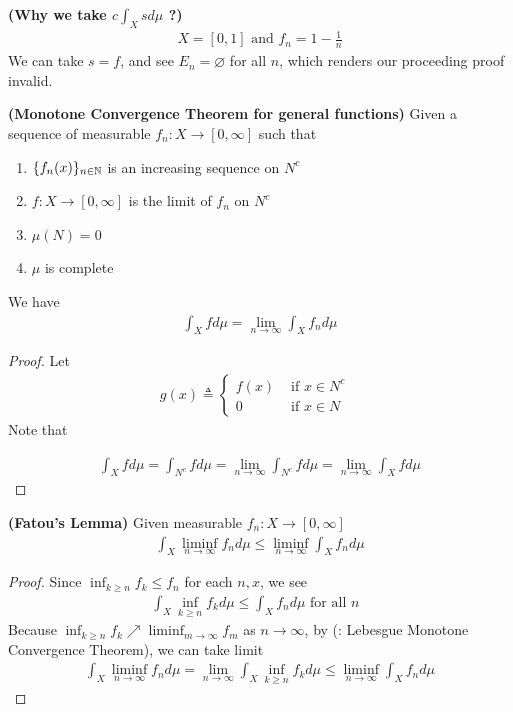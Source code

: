 \documentclass{report}
\begin{document}
\begin{Example}{\textbf{(Why we take $c\int_X sd\mu$ ?)}}{}
\begin{align*}
X=[0,1]\text{ and }f_n=1-\frac{1}{n}
\end{align*}
We can take $s=f$, and see $E_n=\varnothing$ for all $n$, which renders our proceeding proof invalid. 
\end{Example}
\begin{corollary}
\textbf{(Monotone Convergence Theorem for general functions)} Given a sequence of measurable $f_n:X\rightarrow [0,\infty]$ such that
\begin{enumerate}[label=(\alph*)]
  \item $\{ f_n(x) \}_{n\in\mathbb{N}}$ is an increasing sequence on $N^c$
  \item $f:X\rightarrow [0,\infty]$ is the limit of $f_n$ on $N^c$ 
  \item $\mu (N)=0$
  \item $\mu$ is complete
\end{enumerate}
We have 
\begin{align*}
\int_X fd\mu = \lim_{n\to \infty}\int_X f_nd\mu
\end{align*}
\end{corollary}
\begin{proof}
Let
\begin{align*}
g(x)\triangleq \begin{cases}
  f(x)& \text{ if $x \in N^c$ }\\
  0& \text{ if $x\in N$ }
\end{cases}
\end{align*}
Note that 



\begin{align*}
\int_X fd\mu = \int_{N^c}fd\mu = \lim_{n\to \infty}\int_{N^c} fd\mu = \lim_{n\to \infty} \int_X fd\mu
\end{align*}
\end{proof}
\begin{theorem}
\label{Fatou}
\textbf{(Fatou's Lemma)} Given measurable $f_n:X\rightarrow [0,\infty]$ 
\begin{align*}
\int_X \liminf_{n\to\infty} f_nd\mu \leq \liminf_{n\to\infty} \int_X f_n d\mu
\end{align*}
\end{theorem}
\begin{proof}
Since $\inf_{k\geq n}f_k\leq f_n$ for each $n,x$, we see 
 \begin{align*}
\int_X \inf_{k\geq n}f_k d\mu \leq \int_X f_nd\mu\text{ for all $n$ }
\end{align*}
Because $\inf_{k\geq n}f_k\nearrow  \liminf_{m\to\infty} f_m$ as $n\to \infty$, by (: Lebesgue Monotone Convergence Theorem), we can take limit 
\begin{align*}
\int_X \liminf_{n\to\infty} f_n d\mu = \lim_{n\to \infty}\int_X \inf_{k\geq n}f_k d\mu\leq \liminf_{n\to\infty} \int_X f_nd\mu
\end{align*}
\end{proof}
\end{document}

